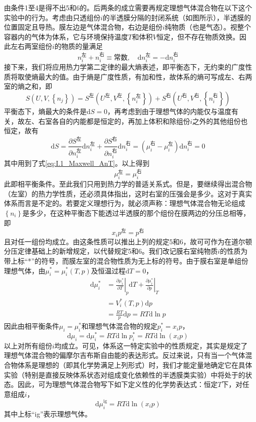 \documentclass[main.tex]{subfiles}
\begin{document}
由条件1至4是得不出5和6的。后两条的成立需要再规定理想气体混合物在以下这个实验中的行为。考虑由只透组份$i$的半透膜分隔的封闭系统（如图所示），半透膜的位置固定且导热。膜左边是气体混合物，右边是组份$i$纯物质（也是气态）。视整个容器内的气体为体系，它与环境保持温度$T$和体积$V$恒定，但不存在物质效换。因此左右两室组份$i$的物质的量满足
\[n_i^\text{左}+n_i^\text{右}\equiv\text{常数},\quad \mathrm{d}n_i^\text{左}=-\mathrm{d}n_i^\text{右}\]
接下来，我们将应用热力学第二定律的最大熵表述，即平衡态下，无约束的广度性质将取使熵最大的值。由于熵是广度性质，有加和性，故体系的熵可写成左、右两室的熵之和，即
\[S\left(U,V,\left\{n_j\right\}\right)=S^\text{左}\left(U^\text{左},V^\text{左},\left\{n_i^\text{左}\right\}\right)+S^\text{右}\left(U^\text{右},V^\text{右},\left\{n_i^\text{右}\right\}\right)\]
平衡态下，熵最大的条件是$\mathrm{d}S=0$，再考虑到由于理想气体的内能仅与温度有关，故左、右室各自的内能都是恒定的，再加上体积和除组份$i$之外的其他组份也恒定，故有
\[\mathrm{d}S=\frac{\partial S^\text{左}}{\partial n_i^\text{左}}\mathrm{d}n_i^\text{左}+\frac{\partial S^\text{右}}{\partial n_i^\text{右}}\mathrm{d}n_i^\text{右}=\left(\mu_i^\text{右}-\mu_i^\text{左}\right)\mathrm{d}n_i^\text{右}=0\]
其中用到了式\eqref{eq:I.1_Maxwell_AnT}。以上得到
\[\mu_i^\text{左}=\mu_i^\text{右}\]
此即相平衡条件。至此我们只用到热力学的普适关系式。但是，要继续得出混合物（左室）的热力学性质，还必须具体指出，这时右室的压强会是多少。这对于真实体系而言是不定的。若要定义理想行为，就必须声称：理想气体混合物无论组成$\left\{n_i\right\}$是多少，在这种平衡态下能透过半透膜的那个组份在膜两边的分压总相等，即
\[x_ip^\text{左}=p^\text{右}\]
且对任一组份均成立。由这条性质可以推出上列的规定5和6，故可可作为在道尔顿分压定律基础上的新增规定，以代替规定5和6。我们改记膜右室纯物质$i$的性质为带上标“*”的符号，而膜左室的混合物性质为无上标的符号。由于膜右室是单组份理想气体，由$\mu_i^*=\mu_i^*\left(T,p\right)$及恒温过程$\mathrm{d}T=0$，
\begin{align*}
    \mathrm{d}\mu_i^* & =\left.\frac{\partial \mu_i^*}{\partial T}\right|_{p}\mathrm{d}T+\left.\frac{\partial\mu_i^*}{\partial p}\right|_{T} \\
                      & =V_i^*\left(T,p\right)\mathrm{d}p                                                                                    \\
                      & =\frac{RT}{p}\mathrm{d}p=RT\mathrm{d}\ln p
\end{align*}
因此由相平衡条件$\mu_i=\mu_i^*$和理想气体混合物的规定$p_i^*=x_ip$，
\[\mathrm{d}\mu_i=\mathrm{d}\mu_i^*=RT\mathrm{d}\ln p_i^*=RT\mathrm{d}\ln\left(x_ip\right)\]
以上对所有组份$i$均成立。可见，体系这一特定实验中的性质规定，其实是规定了理想气体混合物的偏摩尔吉布斯自由能的表达形式。反过来说，只有当一个气体混合物体系是理想的（即其化学势满足上列形式）时，我们才能定量地确定它在具体实验（特别是直接反映体系状态对组成变化依赖性的半透膜类实验）中将处于的状态。因此，可为理想气体混合物写下如下定义性的化学势表达式：恒定$T$下，对任意组成$i$，
\begin{equation}\label{eq:II.3_def_ideal_gas_mixture_mu}
    \mathrm{d}\mu_i^\text{ig}=RT\mathrm{d}\ln\left(x_i p\right)
\end{equation}
其中上标“ig”表示理想气体。
\end{document}
